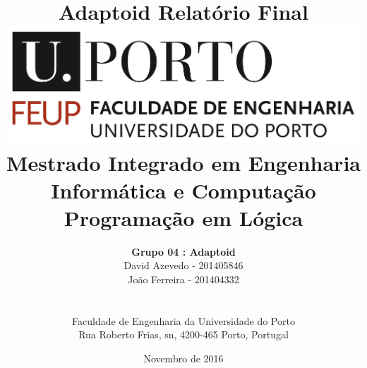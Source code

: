 \documentclass[a4paper]{article}
\begin{document}
\setlength{\textwidth}{16cm}
\setlength{\textheight}{22cm}

\title{\Huge\textbf{Adaptoid}\linebreak\linebreak\linebreak
\Large\textbf{Relatório Final}\linebreak\linebreak
\linebreak\linebreak
\includegraphics[scale=0.1]{feup-logo.png}\linebreak\linebreak
\linebreak\linebreak
\Large{Mestrado Integrado em Engenharia Informática e Computação} \linebreak\linebreak
\Large{Programação em Lógica}\linebreak
}

\author{\textbf{Grupo 04 : Adaptoid}\\ David Azevedo - 201405846 \\ João Ferreira - 201404332 \\\linebreak\linebreak \\
 \\ Faculdade de Engenharia da Universidade do Porto \\ Rua Roberto Frias, s\/n, 4200-465 Porto, Portugal \linebreak\linebreak\linebreak
\linebreak\linebreak\vspace{1cm}}
\date{Novembro de 2016}
\maketitle
\thispagestyle{empty}
\end{document}
